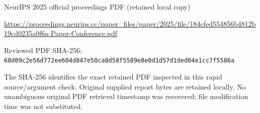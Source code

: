 \documentclass[11pt]{article}
\begin{document}
NeurIPS 2025 official proceedings PDF (retained local copy)

\url{https://proceedings.neurips.cc/paper_files/paper/2025/file/184cfed554856b4812b19cd0235a0f6a-Paper-Conference.pdf}

Reviewed PDF SHA-256: \nolinkurl{68d09c2e56d772ee604d847e50ca8d58f5589e8e0d1d57d1ded04e1cc7f5586a}

The SHA-256 identifies the exact retained PDF inspected in this rapid source/argument check. Original supplied report bytes are retained locally. No unambiguous original PDF retrieval timestamp was recovered; file modification time was not substituted.
\end{document}
